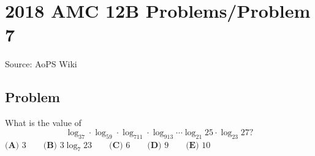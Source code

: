 \documentclass[12pt]{article}
\begin{document}
\section*{{2018 AMC 12B Problems/Problem 7}}
Source: AoPS Wiki

\subsection*{Problem}
What is the value of \[\log_37\cdot\log_59\cdot\log_711\cdot\log_913\cdots\log_{21}25\cdot\log_{23}27?\] $\textbf{(A) } 3 \qquad \textbf{(B) } 3\log_{7}23 \qquad \textbf{(C) } 6 \qquad \textbf{(D) } 9 \qquad \textbf{(E) } 10$
\end{document}

